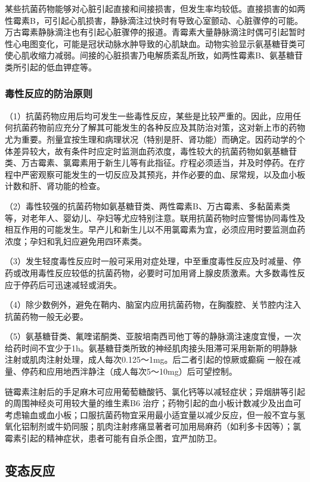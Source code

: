 某些抗菌药物能够对心脏引起直接和间接损害，但发生率均较低。直接损害的如两性霉素B，可引起心肌损害，静脉滴注过快时有导致心室颤动、心脏骤停的可能。万古霉素静脉滴注也有引起心脏骤停的报道。青霉素大量静脉滴注时偶可引起暂时性心电图变化，可能是冠状动脉水肿导致的心肌缺血。动物实验显示氨基糖苷类可使心肌收缩力减弱。间接的心脏损害乃电解质紊乱所致，如两性霉素B、氨基糖苷类所引起的低血钾症等。

\subsubsection{毒性反应的防治原则}

（1）抗菌药物应用后均可发生一些毒性反应，某些是比较严重的。因此，应用任何抗菌药物前应充分了解其可能发生的各种反应及其防治对策，这对新上市的药物尤为重要。剂量宜按生理和病理状况（特别是肝、肾功能）而确定。因药动学的个体差异较大，故有条件时应定时监测血药浓度，毒性较大的抗菌药物如氨基糖苷类、万古霉素、氯霉素用于新生儿等有此指征。疗程必须适当，并及时停药。在疗程中严密观察可能发生的一切反应及其预兆，并作必要的血、尿常规，以及血小板计数和肝、肾功能的检查。

（2）毒性较强的抗菌药物如氨基糖苷类、两性霉素B、万古霉素、多黏菌素类等，对老年人、婴幼儿、孕妇等尤应特别注意。联用抗菌药物时应警惕协同毒性及相互作用的可能发生。早产儿和新生儿以不用氯霉素为宜，必须应用时要监测血药浓度；孕妇和乳妇应避免用四环素类。

（3）发生轻度毒性反应时一般可采用对症处理，中至重度毒性反应及时减量、停药或改用毒性反应较低的抗菌药物，必要时可加用肾上腺皮质激素。大多数毒性反应于停药后可迅速减轻或消失。

（4）除少数例外，避免在鞘内、脑室内应用抗菌药物，在胸腹腔、关节腔内注入抗菌药物一般无必要。

（5）氨基糖苷类、氟喹诺酮类、亚胺培南西司他丁等的静脉滴注速度宜慢，一次给药时间不宜少于1h。氨基糖苷类所致的神经肌肉接头阻滞可采用新斯的明静脉注射或肌肉注射处理，成人每次0.125～1mg。后二者引起的惊厥或癫痫
一般在减量、停药和应用地西泮静注（成人每次5～10mg）后可望控制。

链霉素注射后的手足麻木可应用葡萄糖酸钙、氯化钙等以减轻症状；异烟肼等引起的周围神经炎可用较大量的维生素B{6}
治疗；药物引起的血小板计数减少及出血可考虑输血或血小板；口服抗菌药物宜采用最小适宜量以减少反应，但一般不宜与氢氧化铝制剂或牛奶同服；肌肉注射疼痛显著者可加用局麻药（如利多卡因等）；氯霉素引起的精神症状，患者可能有自杀企图，宜严加防卫。

\subsection{变态反应}

